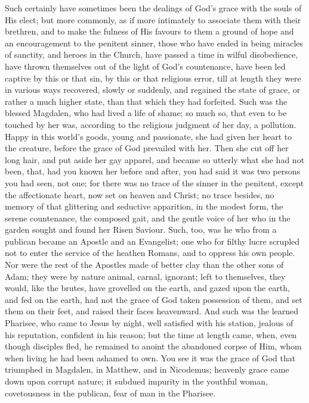 Such certainly have sometimes been the dealings of God's grace with
the souls of His elect; but more commonly, as if more intimately to
associate them with their brethren, and to make the fulness of His
favours to them a ground of hope and an encouragement to the penitent
sinner, those who have ended in being miracles of sanctity, and heroes
in the Church, have passed a time in wilful disobedience, have thrown
themselves out of the light of God's countenance, have been led
captive by this or that sin, by this or that religious error, till at
length they were in various ways recovered, slowly or suddenly, and
regained the state of grace, or rather a much higher state, than that
which they had forfeited. Such was the blessed Magdalen, who had lived
a life of shame; so much so, that even to be touched by her was,
according to the religious judgment of her day, a pollution. Happy in
this world's goods, young and passionate, she had given her heart to
the creature, before the grace of God prevailed with her. Then she cut
off her long hair, and put aside her gay apparel, and became so
utterly what she had not been, that, had you known her before and
after, you had said it was two persons you had seen, not one; for
there was no trace of the sinner in the penitent, except the
affectionate heart, now set on heaven and Christ; no trace besides, no
memory of that glittering and seductive apparition, in the modest
form, the serene countenance, the composed gait, and the gentle voice
of her who in the garden sought and found her Risen Saviour. Such,
too, was he who from a publican became an Apostle and an Evangelist;
one who for filthy lucre scrupled not to enter the service of the
heathen Romans, and to oppress his own people. Nor were the rest of
the Apostles made of better clay than the other sons of Adam; they
were by nature animal, carnal, ignorant; left to themselves, they
would, like the brutes, have grovelled on the earth, and gazed upon
the earth, and fed on the earth, had not the grace of God taken
possession of them, and set them on their feet, and raised their faces
heavenward. And such was the learned Pharisee, who came to Jesus by
night, well satisfied with his station, jealous of his reputation,
confident in his reason; but the time at length came, when, even
though disciples fled, he remained to anoint the abandoned corpse of
Him, whom when living he had been ashamed to own. You see it was the
grace of God that triumphed in Magdalen, in Matthew, and in Nicodemus;
heavenly grace came down upon corrupt nature; it subdued impurity in
the youthful woman, covetousness in the publican, fear of man in the
Pharisee.


